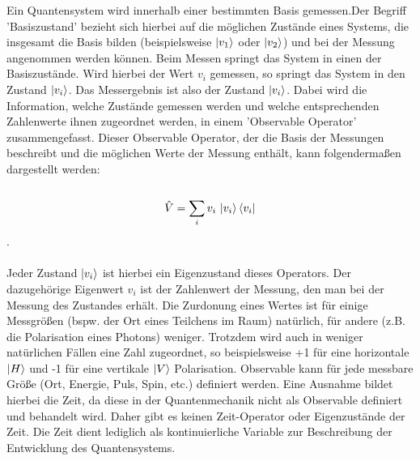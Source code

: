 Ein Quantensystem wird innerhalb einer bestimmten Basis gemessen.Der Begriff 'Basiszustand' bezieht sich hierbei auf die möglichen Zustände eines Systems, die insgesamt die Basis bilden (beispielsweise $\ket{v_1}$ oder $\ket{v_2}$) und bei der Messung angenommen werden können.
Beim Messen springt das System in einen der Basiszustände. 
Wird hierbei der Wert $v_i$ gemessen, so springt das System in den Zustand $\ket{v_i}$. Das Messergebnis ist also der Zustand $\ket{v_i}$. 
Dabei wird die Information, welche Zustände gemessen werden und welche entsprechenden Zahlenwerte ihnen zugeordnet werden, in einem 'Observable Operator' zusammengefasst. 
Dieser Observable Operator, der die Basis der Messungen beschreibt und die möglichen Werte der Messung enthält, kann folgendermaßen dargestellt werden: \\
\\
\begin{equation}
\hat{V} = \sum_i v_i \, \ket{v_i}\bra{v_i}
\end{equation}.
\\ 
\\
Jeder Zustand $\ket{v_i}$ ist hierbei ein Eigenzustand dieses Operators. Der dazugehörige Eigenwert $v_i$ ist der Zahlenwert der Messung, den man bei der Messung des Zustandes erhält. 
Die Zurdonung eines Wertes ist für einige Messgrößen (bspw. der Ort eines Teilchens im Raum) natürlich, für andere (z.B. die Polarisation eines Photons) weniger. Trotzdem wird auch in weniger natürlichen Fällen  eine Zahl zugeordnet, so beispielsweise
+1 für eine horizontale $\ket{H}$ und -1 für eine vertikale $\ket{V}$ Polarisation. 
Observable kann für jede messbare Größe (Ort, Energie, Puls, Spin, etc.) definiert werden. Eine Ausnahme bildet hierbei die Zeit, da diese in der Quantenmechanik nicht als Observable definiert und behandelt wird.
Daher gibt es keinen Zeit-Operator oder Eigenzustände der Zeit. Die Zeit dient lediglich als kontinuierliche Variable zur Beschreibung der Entwicklung des Quantensystems. 
\cite{lvosvsky_quantum_2018} 
\\
\\

